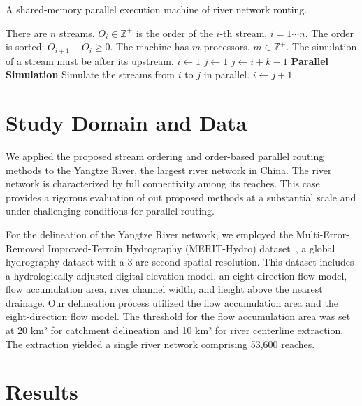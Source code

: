 \documentclass[water,article,submit,pdftex,moreauthors]{Definitions/mdpi}
\begin{document}
\begin{algorithm}
	\caption{A shared-memory parallel execution machine of river network routing.}
	\label{alg:shared_memory}
	\begin{algorithmic}
		\REQUIRE There are $n$ streams. $O_i \in \mathbb{Z}^{+}$ is the order of the $i$-th stream, $i = 1\cdots{}n$. The order is sorted: $O_{i+1} - O_i \ge 0$.
		\REQUIRE The machine has $m$ processors. $m \in \mathbb{Z}^{+}$.
		\ENSURE The simulation of a stream must be after its upstream.
		\STATE $i \gets 1$ 
		\STATE $j \gets 1$ 
		\STATE $j \gets i + k - 1$
		\ENDIF
		\ENDFOR
		\STATE \textbf{Parallel Simulation} Simulate the streams from $i$ to $j$ in parallel.
		\STATE $i \gets j + 1$
		\ENDWHILE
	\end{algorithmic}
\end{algorithm}

\section{Study Domain and Data}
\label{sec:domain}

We applied the proposed stream ordering and order-based parallel routing methods to the Yangtze River, the largest river network in China. The river network is characterized by full connectivity among its reaches. This case provides a rigorous evaluation of out proposed methods at a substantial scale and under challenging conditions for parallel routing.

For the delineation of the Yangtze River network, we employed the Multi-Error-Removed Improved-Terrain Hydrography (MERIT-Hydro) dataset~\cite{yamazaki2017GRL, yamazaki2019WRR}, a global hydrography dataset with a 3 arc-second spatial resolution. This dataset includes a hydrologically adjusted digital elevation model, an eight-direction flow model, flow accumulation area, river channel width, and height above the nearest drainage. Our delineation process utilized the flow accumulation area and the eight-direction flow model. The threshold for the flow accumulation area was set at 20 km² for catchment delineation and 10 km² for river centerline extraction. The extraction yielded a single river network comprising 53,600 reaches.

\section{Results}
\label{sec:results}
\end{document}
